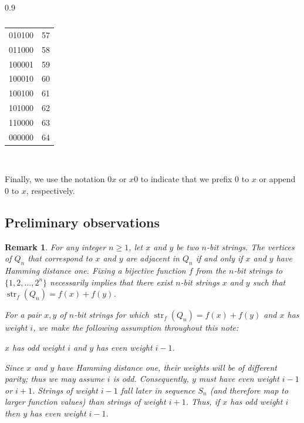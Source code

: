 \documentclass[12pt]{article}
\newtheorem{remark}[theorem]{Remark}
\DeclareMathOperator{\str}{str}
\begin{document}
\begin{table}[h!]
\begin{minipage}{0.45\textwidth}
\begin{subtable}[t]{0.9\textwidth}
\begin{tabular}{||c|c|}
010100 & 57\\
011000 & 58\\
100001 & 59\\
100010 & 60\\
100100 & 61\\
101000 & 62\\
110000 & 63\\
\hline
000000 & 64\\
\hline
\end{tabular} 
\caption{Sequence $S_6$ with $R_6^1$, $R_6^3$, $R_6^5$ on the left, $S_6^6$, $S_6^4$, $S_6^2$, $S_6^0$ on the right.}
\label{tab:n=6}
\end{subtable} 

\vspace{0.9in}
~

\end{minipage}
\caption{}
\end{table}


Finally, we use the notation $0x$ or $x0$ to indicate that we prefix $0$ to $x$ or append $0$ to $x$, respectively.  

\subsection{Preliminary observations}

\begin{remark}\label{remark1}
For any integer $n \geq 1$, let $x$ and $y$ be two $n$-bit strings. The vertices of $Q_n$ that correspond to $x$ and $y$ are adjacent in $Q_n$ if and only if $x$ and $y$ have Hamming distance one. Fixing a bijective function $f$ from the $n$-bit strings to $\{1, 2, \ldots, 2^n\}$ necessarily implies that there exist $n$-bit strings $x$ and $y$ such that $\str_f(Q_n) = f(x)+f(y)$. 

For a pair $x,y$ of $n$-bit strings for which  $\str_f(Q_n)=f(x)+f(y)$ and $x$ has weight $i$, we make the following assumption throughout this note: 

\begin{center}
    $x$ has odd weight $i$ and $y$ has even weight $i-1$.
\end{center}

\noindent
Since $x$ and $y$ have Hamming distance one, their weights will be of different parity; thus we may assume $i$ is odd.  Consequently, $y$ must have even weight $i-1$ or $i+1$.  Strings of weight $i-1$ fall later in sequence $S_n$ (and therefore map to larger function values) than strings of weight $i+1$. Thus, if $x$ has odd weight $i$ then $y$ has even weight $i-1$.
 \end{remark}
\end{document}
